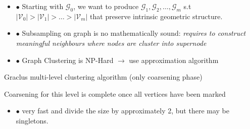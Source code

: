 \documentclass[8pt]{beamer}
\begin{document}
\begin{frame}

\begin{itemize}
\item[] $\bullet$ Starting with $\mathcal{G}_0$, we want to produce $\mathcal{G}_1, \mathcal{G}_2, \dots, \mathcal{G}_m$ s.t $|\mathcal{V}_0| > |\mathcal{V}_1| > \ldots > |\mathcal{V}_m|$ that preserve intrinsic geometric structure.
\item[] $\bullet$ Subsampling on graph is no mathematically sound: \textit{requires to construct meaningful neighbours where nodes are cluster into supernode} \\
\item[] $\bullet$ Graph Clustering is NP-Hard $ \rightarrow $ use approximation algorithm \\
\end{itemize}

\begin{algorithm}[H]
\caption{Graclus multi-level clustering algorithm (only coarsening phase)}
\small
\begin{algorithmic}[1]
\small 
{}
	\Else
	\EndIf
\State Coarsening for this level is complete once all vertices have been marked
\end{algorithmic}
\end{algorithm}

\begin{itemize}
	\item[] $\bullet$ very fast and divide the size by approximately 2, but there may be singletons.
\end{itemize}
\end{frame}
\end{document}

